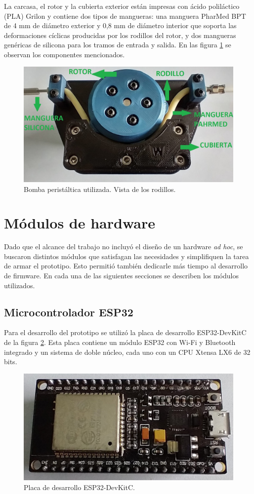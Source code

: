 La carcasa, el rotor y la cubierta exterior están impresas con ácido poliláctico (PLA) Grilon y contiene dos tipos de mangueras: una manguera PharMed BPT de 4 mm de diámetro exterior y 0,8 mm de diámetro interior que soporta las deformaciones cíclicas producidas por los rodillos del rotor, y dos mangueras genéricas de silicona para los tramos de entrada y salida. En las figura \ref{fig:bombaFrente} se observan los componentes mencionados.

\begin{figure}[htbp]
	\centering
	\includegraphics[width=.6\textwidth]{./Figures/bombaFrente.jpg}
	\caption{Bomba peristáltica utilizada. Vista de los rodillos.}
	\label{fig:bombaFrente}
\end{figure}

\section{Módulos de hardware}

Dado que el alcance del trabajo no incluyó el diseño de un hardware \textit{ad hoc}, se buscaron distintos módulos que satisfagan las necesidades y simplifiquen la tarea de armar el prototipo. Esto permitió también dedicarle más tiempo al desarrollo de firmware. En cada una de las siguientes secciones se describen los módulos utilizados.

\subsection{Microcontrolador ESP32}

Para el desarrollo del prototipo se utilizó la placa de desarrollo ESP32-DevKitC de la figura \ref{fig:ESP32.jpeg}. Esta placa contiene un módulo ESP32 con Wi-Fi y Bluetooth integrado y un sistema de doble núcleo, cada uno con un CPU Xtensa LX6 de 32 bits.

\begin{figure}[htbp]
	\centering
	\includegraphics[width=.5\textwidth]{./Figures/ESP32.jpeg}
	\caption{Placa de desarrollo ESP32-DevKitC.}
	\label{fig:ESP32.jpeg}
\end{figure}

